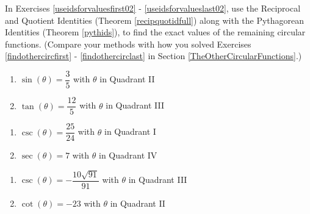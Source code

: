 \documentclass{ximera}
\begin{document}
In Exercises \ref{useidsforvaluesfirst02} - \ref{useidsforvalueslast02}, use the Reciprocal and Quotient Identities (Theorem \ref{recipquotidfull}) along with the Pythagorean Identities (Theorem \ref{pythids}), to find the exact values of the remaining circular functions.  (Compare your methods with how you solved Exercises \ref{findothercircfirst} - \ref{findothercirclast} in Section \ref{TheOtherCircularFunctions}.)


\begin{multicols}{2}

\begin{enumerate}


\setcounter{enumi}{\value{HW}}

\item $\sin(\theta) = \dfrac{3}{5}$ with $\theta$ in Quadrant II \label{useidsforvaluesfirst02}
\item $\tan(\theta) = \dfrac{12}{5}$ with $\theta$ in Quadrant III

\setcounter{HW}{\value{enumi}}

\end{enumerate}

\end{multicols}

\begin{multicols}{2}

\begin{enumerate}

\setcounter{enumi}{\value{HW}}

\item $\csc(\theta) = \dfrac{25}{24}$ with $\theta$ in Quadrant I
\item $\sec(\theta) = 7$ with $\theta$ in Quadrant IV 

\setcounter{HW}{\value{enumi}}

\end{enumerate}

\end{multicols}

\begin{multicols}{2}

\begin{enumerate}

\setcounter{enumi}{\value{HW}}

\item $\csc(\theta) = -\dfrac{10\sqrt{91}}{91}$ with $\theta$ in Quadrant III
\item $\cot(\theta) = -23$ with $\theta$ in Quadrant II 

\setcounter{HW}{\value{enumi}}

\end{enumerate}

\end{multicols}
\end{document}
